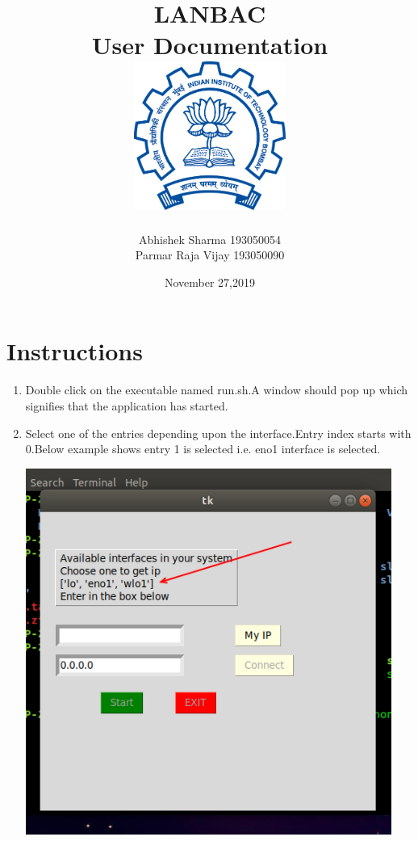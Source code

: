 \documentclass[12pt]{article}
\title{
    {\Huge LANBAC}\\
    {\Large User Documentation}\\
    \vspace{+35pt}
    {\includegraphics[width=50mm,scale=0.5]{iitb.png}}
}
\author{
    \large Abhishek Sharma 193050054\\
    \large Parmar Raja Vijay 193050090
}
\date{November 27,2019}
\begin{document}
\maketitle
\clearpage
\section*{Instructions}

\begin{enumerate}
    \item Double click on the executable named run.sh.A window should pop up which signifies that the application has started.
    
    \item Select one of the entries depending upon the interface.Entry index starts with 0.Below example shows entry 1 is selected i.e. eno1 interface is selected.
    
    \includegraphics[width=120mm,scale=0.8]{1.png}
    

\end{enumerate}
\end{document}
